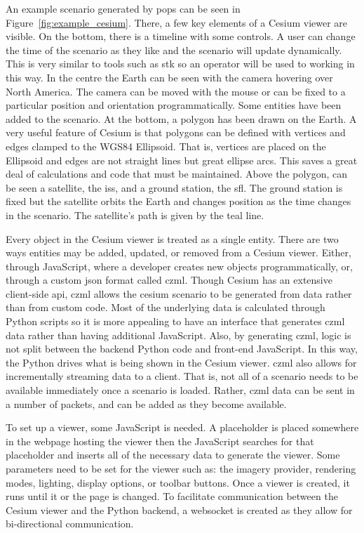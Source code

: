 An example scenario generated by \gls{pops} can be seen in
Figure~\ref{fig:example_cesium}. There, a few key elements of a Cesium viewer
are visible. On the bottom, there is a timeline with some controls. A user can
change the time of the scenario as they like and the scenario will update
dynamically. This is very similar to tools such as \gls{stk} so an operator
will be used to working in this way. In the centre the Earth can be seen with
the camera hovering over North America.  The camera can be moved with the mouse
or can be fixed to a particular position and orientation programmatically.
Some entities have been added to the scenario. At the bottom, a polygon has
been drawn on the Earth. A very useful feature of Cesium is that polygons can
be defined with vertices and edges clamped to the WGS84 Ellipsoid. That is,
vertices are placed on the Ellipsoid and edges are not straight lines but great
ellipse arcs. This saves a great deal of calculations and code that must be
maintained. Above the polygon, can be seen a satellite, the \gls{iss}, and a
ground station, the \gls{sfl}. The ground station is fixed but the satellite
orbits the Earth and changes position as the time changes in the scenario. The
satellite's path is given by the teal line. 

Every object in the Cesium viewer is treated as a single entity. There are two
ways entities may be added, updated, or removed from a Cesium viewer. Either,
through JavaScript, where a developer creates new objects programmatically, or,
through a custom \gls{json} format called \gls{czml}. Though Cesium has an
extensive client-side \gls{api}, \gls{czml} allows the cesium scenario to be
generated from data rather than from custom code. Most of the underlying data
is calculated through Python scripts so it is more appealing to have an
interface that generates \gls{czml} data rather than having additional
JavaScript. Also, by generating \gls{czml}, logic is not split between the
backend Python code and front-end JavaScript. In this way, the Python drives
what is being shown in the Cesium viewer. \gls{czml} also allows for
incrementally streaming data to a client. That is, not all of a scenario needs
to be available immediately once a scenario is loaded. Rather, \gls{czml} data
can be sent in a number of packets, and can be added as they become available.

To set up a viewer, some JavaScript is needed. A placeholder is placed
somewhere in the webpage hosting the viewer then the JavaScript searches for
that placeholder and inserts all of the necessary data to generate the viewer.
Some parameters need to be set for the viewer such as: the imagery provider,
rendering modes, lighting, display options, or toolbar buttons. Once a viewer
is created, it runs until it or the page is changed.  To facilitate
communication between the Cesium viewer and the Python backend, a websocket is
created as they allow for bi-directional communication. 

